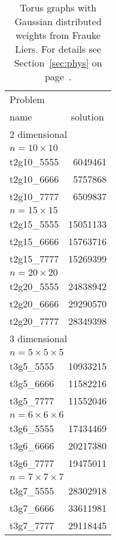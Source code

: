 \documentclass[a4paper, 12pt]{article}
\begin{document}
\begin{table}
\begin{center}
\begin{tabular}{|l|r|}
\hline
Problem & \\
name &\multicolumn{1}{|c|}{solution}\\
\hline
\multicolumn{2}{|l|}{2 dimensional}\\
\hline
\multicolumn{2}{|l|}{$n=10 \times 10$}\\
\hline
t2g10\_5555 & 6049461 \\
t2g10\_6666 & 5757868 \\
t2g10\_7777 & 6509837 \\
\hline
\multicolumn{2}{|l|}{$n=15 \times 15$}\\
\hline
t2g15\_5555 & 15051133 \\
t2g15\_6666 & 15763716 \\
t2g15\_7777 & 15269399 \\
\hline 
\multicolumn{2}{|l|}{$n=20 \times 20$}\\
\hline
t2g20\_5555 & 24838942 \\
t2g20\_6666 & 29290570 \\
t2g20\_7777 & 28349398 \\
\hline
\multicolumn{2}{|l|}{3 dimensional}\\
\hline
\multicolumn{2}{|l|}{$n=5 \times 5 \times 5$}\\
\hline
t3g5\_5555 & 10933215 \\
t3g5\_6666 & 11582216 \\
t3g5\_7777 & 11552046 \\
\hline
\multicolumn{2}{|l|}{$n=6 \times 6 \times 6$}\\
\hline
t3g6\_5555 & 17434469 \\
t3g6\_6666 & 20217380 \\
t3g6\_7777 & 19475011 \\
\hline
\multicolumn{2}{|l|}{$n=7 \times 7 \times 7$}\\
\hline
t3g7\_5555 & 28302918 \\
t3g7\_6666 & 33611981 \\
t3g7\_7777 & 29118445 \\
\hline
\end{tabular}
\caption{Torus graphs with Gaussian distributed weights from Frauke Liers. 
  For details see Section~\ref{sec:phys} on
  page~\pageref{sec:phys}.} \label{tab:tg} 
\end{center}
\end{table}
\end{document}
